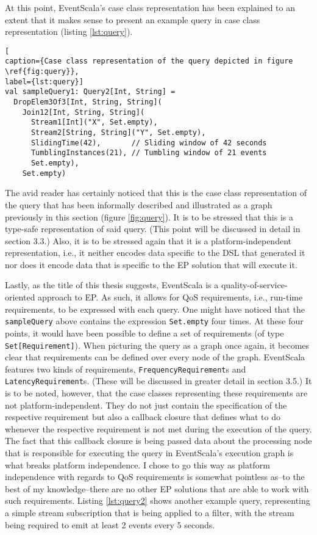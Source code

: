 \documentclass[article, type=bsc, colorback, accentcolor=tud8b, parskip=half, bibliography=totocnumbered]{tudthesis}
\begin{document}
At this point, EventScala's case class representation has been explained to an extent that it makes sense to present an example query in case class representation (listing \ref{lst:query}).

\begin{lstlisting}[
caption={Case class representation of the query depicted in figure \ref{fig:query}},
label={lst:query}]
val sampleQuery1: Query2[Int, String] =
  DropElem3Of3[Int, String, String](
    Join12[Int, String, String](
      Stream1[Int]("X", Set.empty),
      Stream2[String, String]("Y", Set.empty),
      SlidingTime(42),       // Sliding window of 42 seconds
      TumblingInstances(21), // Tumbling window of 21 events
      Set.empty),
    Set.empty)
\end{lstlisting}

The avid reader has certainly noticed that this is the case class representation of the query that has been informally described and illustrated as a graph previously in this section (figure \ref{fig:query}).
It is to be stressed that this is a type-safe representation of said query.
(This point will be discussed in detail in section 3.3.)
Also, it is to be stressed again that it is a platform-independent representation, i.e., it neither encodes data specific to the DSL that generated it nor does it encode data that is specific to the EP solution that will execute it.

Lastly, as the title of this thesis suggests, EventScala is a quality-of-service-oriented approach to EP.
As such, it allows for QoS requirements, i.e., run-time requirements, to be expressed with each query.
One might have noticed that the \lstinline{sampleQuery} above contains the expression \lstinline{Set.empty} four times.
At these four points, it would have been possible to define a set of requirements (of type \lstinline{Set[Requirement]}).
When picturing the query as a graph once again, it becomes clear that requirements can be defined over every node of the graph.
EventScala features two kinds of requirements, \lstinline{FrequencyRequirement}s and \lstinline{LatencyRequirement}s.
(These will be discussed in greater detail in section 3.5.)
It is to be noted, however, that the case classes representing these requirements are not platform-independent.
They do not just contain the specification of the respective requirement but also a callback closure that defines what to do whenever the respective requirement is not met during the execution of the query.
The fact that this callback closure is being passed data about the processing node that is responsible for executing the query in EventScala's execution graph is what breaks platform independence.
I chose to go this way as platform independence with regards to QoS requirements is somewhat pointless as--to the best of my knowledge--there are no other EP solutions that are able to work with such requirements.
Listing \ref{lst:query2} shows another example query, representing a simple stream subscription that is being applied to a filter, with the stream being required to emit at least 2 events every 5 seconds.
\end{document}
